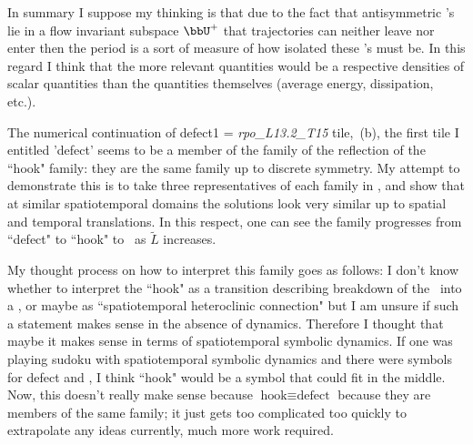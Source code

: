 \begin{itemize}
In summary I suppose my thinking is that due to the fact that
antisymmetric \po 's lie in a flow invariant subspace $\bbU^+$ that
trajectories can neither leave nor enter then the period is a sort of
measure of how isolated these \po 's must be. In this regard I think that
the more relevant quantities would be a respective densities of scalar
quantities than the quantities themselves (average energy, dissipation,
etc.).

The numerical continuation of defect1 = \emph{rpo\_L13.2\_T15}  tile,
\,(b), the first tile I entitled 'defect'
seems to be a member of the family of the reflection of the ``hook"
family: they are the same family up to discrete symmetry. My attempt
to demonstrate this is to take three representatives of each family in
, and show that at similar
spatiotemporal domains the solutions look very similar up to spatial and
temporal translations.
In this respect, one can see the family progresses from ``defect"
 to ``hook" to \reqv\, as $\tilde{L}$ increases.

My thought process on how to interpret this family goes as follows:
I don't know whether to interpret the ``hook" as a transition describing
breakdown of the \twot\ into a \reqv, or maybe as ``spatiotemporal
heteroclinic connection" but I am unsure if such a statement makes sense
in the absence of dynamics. Therefore I thought that maybe it makes sense
in terms of spatiotemporal symbolic dynamics. If one was playing sudoku
with spatiotemporal symbolic dynamics and there were symbols for defect
and \reqv, I think ``hook" would be a symbol that could fit in the
middle. Now, this doesn't really make sense because $\text{hook}\equiv
\text{defect}$ because they are members of the same family; it just gets
too complicated too quickly to extrapolate any ideas currently, much more
work required.


\end{itemize}
